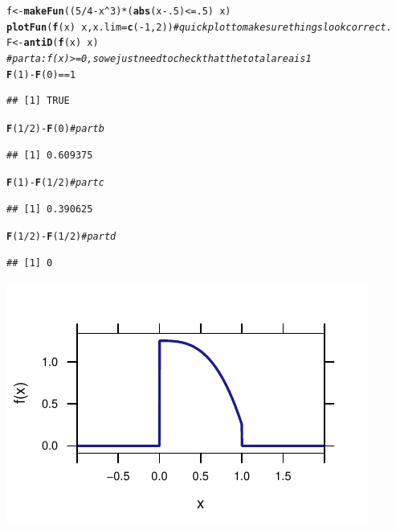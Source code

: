 \documentclass[twoside]{book}\usepackage[]{graphicx}\usepackage[]{xcolor}
\makeatletter
\def\maxwidth{ %
  \ifdim\Gin@nat@width>\linewidth
    \linewidth
  \else
    \Gin@nat@width
  \fi
}
\newcommand{\hlnum}[1]{\textcolor[rgb]{0.686,0.059,0.569}{#1}}%
\newcommand{\hlcom}[1]{\textcolor[rgb]{0.678,0.584,0.686}{\textit{#1}}}%
\newcommand{\hlopt}[1]{\textcolor[rgb]{0,0,0}{#1}}%
\newcommand{\hlstd}[1]{\textcolor[rgb]{0.345,0.345,0.345}{#1}}%
\newcommand{\hlkwb}[1]{\textcolor[rgb]{0.69,0.353,0.396}{#1}}%
\newcommand{\hlkwc}[1]{\textcolor[rgb]{0.333,0.667,0.333}{#1}}%
\newcommand{\hlkwd}[1]{\textcolor[rgb]{0.737,0.353,0.396}{\textbf{#1}}}%
\newenvironment{kframe}{%
 \def\at@end@of@kframe{}%
 \ifinner\ifhmode%
  \def\at@end@of@kframe{\end{minipage}}%
  \begin{minipage}{\columnwidth}%
 \fi\fi%
 \def\FrameCommand##1{\hskip\@totalleftmargin \hskip-\fboxsep
 \colorbox{shadecolor}{##1}\hskip-\fboxsep
     \hskip-\linewidth \hskip-\@totalleftmargin \hskip\columnwidth}%
 \MakeFramed {\advance\hsize-\width
   \@totalleftmargin\z@ \linewidth\hsize
   \@setminipage}}%
 {\par\unskip\endMakeFramed%
 \at@end@of@kframe}
\newenvironment{knitrout}{}{} %
\makeatother
\begin{document}
\begin{solution}
\begin{knitrout}
\color{fgcolor}\begin{kframe}
\begin{alltt}
\hlstd{f} \hlkwb{<-} \hlkwd{makeFun}\hlstd{( (}\hlnum{5}\hlopt{/}\hlnum{4} \hlopt{-} \hlstd{x}\hlopt{^}\hlnum{3}\hlstd{)} \hlopt{*} \hlstd{(} \hlkwd{abs}\hlstd{(x}\hlopt{-}\hlnum{.5}\hlstd{)} \hlopt{<=} \hlnum{.5} \hlstd{)} \hlopt{~} \hlstd{x )}
\hlkwd{plotFun}\hlstd{(}\hlkwd{f}\hlstd{(x)} \hlopt{~} \hlstd{x,} \hlkwc{x.lim}\hlstd{=}\hlkwd{c}\hlstd{(}\hlopt{-}\hlnum{1}\hlstd{,}\hlnum{2}\hlstd{))}  \hlcom{# quick plot to make sure things look correct.}
\hlstd{F} \hlkwb{<-} \hlkwd{antiD}\hlstd{(}\hlkwd{f}\hlstd{(x)} \hlopt{~}\hlstd{x)}
\hlcom{# part a:  f(x) >=0, so we just need to check that the total area is 1}
\hlkwd{F}\hlstd{(}\hlnum{1}\hlstd{)} \hlopt{-} \hlkwd{F}\hlstd{(}\hlnum{0}\hlstd{)} \hlopt{==} \hlnum{1}
\end{alltt}
\begin{verbatim}
## [1] TRUE
\end{verbatim}
\begin{alltt}
\hlkwd{F}\hlstd{(}\hlnum{1}\hlopt{/}\hlnum{2}\hlstd{)} \hlopt{-} \hlkwd{F}\hlstd{(}\hlnum{0}\hlstd{)}     \hlcom{# part b}
\end{alltt}
\begin{verbatim}
## [1] 0.609375
\end{verbatim}
\begin{alltt}
\hlkwd{F}\hlstd{(}\hlnum{1}\hlstd{)} \hlopt{-} \hlkwd{F}\hlstd{(}\hlnum{1}\hlopt{/}\hlnum{2}\hlstd{)}     \hlcom{# part c}
\end{alltt}
\begin{verbatim}
## [1] 0.390625
\end{verbatim}
\begin{alltt}
\hlkwd{F}\hlstd{(}\hlnum{1}\hlopt{/}\hlnum{2}\hlstd{)} \hlopt{-} \hlkwd{F}\hlstd{(}\hlnum{1}\hlopt{/}\hlnum{2}\hlstd{)}   \hlcom{# part d}
\end{alltt}
\begin{verbatim}
## [1] 0
\end{verbatim}
\end{kframe}

{\centering \includegraphics[width=\maxwidth]{figures/fig-unnamed-chunk-70-1} 

}
\end{knitrout}
\end{solution}
\end{document}
